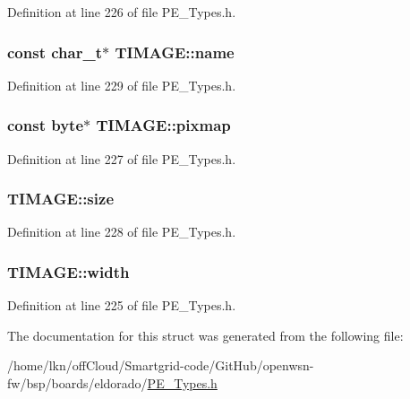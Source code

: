 Definition at line 226 of file P\+E\+\_\+\+Types.\+h.

\subsubsection[{\texorpdfstring{name}{name}}]{\setlength{\rightskip}{0pt plus 5cm}const {\bf char\+\_\+t}$\ast$ T\+I\+M\+A\+G\+E\+::name}\hypertarget{struct_t_i_m_a_g_e_a7ffc92cb3697d03d66a9bdd8cec13918}{}\label{struct_t_i_m_a_g_e_a7ffc92cb3697d03d66a9bdd8cec13918}


Definition at line 229 of file P\+E\+\_\+\+Types.\+h.

\subsubsection[{\texorpdfstring{pixmap}{pixmap}}]{\setlength{\rightskip}{0pt plus 5cm}const {\bf byte}$\ast$ T\+I\+M\+A\+G\+E\+::pixmap}\hypertarget{struct_t_i_m_a_g_e_a6e24a8a0c40f613d1e6a58d5420ab151}{}\label{struct_t_i_m_a_g_e_a6e24a8a0c40f613d1e6a58d5420ab151}


Definition at line 227 of file P\+E\+\_\+\+Types.\+h.

\subsubsection[{\texorpdfstring{size}{size}}]{ T\+I\+M\+A\+G\+E\+::size}\hypertarget{struct_t_i_m_a_g_e_a0b65f7566faf0455718482a387b0e68f}{}\label{struct_t_i_m_a_g_e_a0b65f7566faf0455718482a387b0e68f}


Definition at line 228 of file P\+E\+\_\+\+Types.\+h.

\subsubsection[{\texorpdfstring{width}{width}}]{ T\+I\+M\+A\+G\+E\+::width}\hypertarget{struct_t_i_m_a_g_e_af69564519fe96b6c82d681186ad593f8}{}\label{struct_t_i_m_a_g_e_af69564519fe96b6c82d681186ad593f8}


Definition at line 225 of file P\+E\+\_\+\+Types.\+h.



The documentation for this struct was generated from the following file\+:\begin{DoxyCompactItemize}
\item 
/home/lkn/off\+Cloud/\+Smartgrid-\/code/\+Git\+Hub/openwsn-\/fw/bsp/boards/eldorado/\hyperlink{_p_e___types_8h}{P\+E\+\_\+\+Types.\+h}\end{DoxyCompactItemize}
